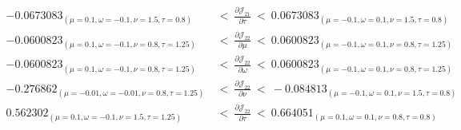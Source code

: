 \documentclass{article}
\begin{document}
\begin{align}
-0.0673083_{(\mu = 0.1, \omega = -0.1, \nu = 1.5, \tau = 0.8)}\ &< \ \frac{\partial {\mathcal J}_{21}}{\partial \tau}  \ < \ 0.0673083_{(\mu = -0.1, \omega = 0.1, \nu = 1.5, \tau = 0.8)}\\ \nonumber
-0.0600823_{(\mu = 0.1, \omega = -0.1, \nu = 0.8, \tau = 1.25)}\ &< \  \frac{\partial {\mathcal J}_{22}}{\partial \mu}  \ < \ 0.0600823_{(\mu = -0.1, \omega = 0.1, \nu = 0.8, \tau = 1.25)}\\ \nonumber
-0.0600823_{(\mu = 0.1, \omega = -0.1, \nu = 0.8, \tau = 1.25)}\ &< \  \frac{\partial {\mathcal J}_{22}}{\partial \omega}  \ < \ 0.0600823_{(\mu = -0.1, \omega = 0.1, \nu = 0.8, \tau = 1.25)}\\ \nonumber
-0.276862_{(\mu = -0.01, \omega = -0.01, \nu = 0.8, \tau = 1.25)}\ &< \  \frac{\partial {\mathcal J}_{22}}{\partial \nu}  \ < \ -0.084813_{(\mu = -0.1, \omega = 0.1, \nu = 1.5, \tau = 0.8)}\\ \nonumber
0.562302_{(\mu = 0.1, \omega = -0.1, \nu = 1.5, \tau = 1.25)}\ &< \ \frac{\partial {\mathcal J}_{22}}{\partial \tau}  \ < \ 0.664051_{(\mu = 0.1, \omega = 0.1, \nu = 0.8, \tau = 0.8)}
\end{align}
\end{document}
